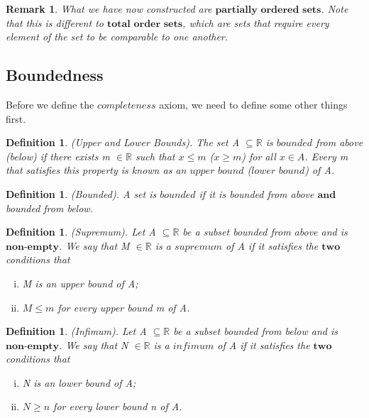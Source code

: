\documentclass[twoside]{article}
\newtheorem{remark}[theorem]{Remark}
\newtheorem{definition}[theorem]{Definition}
\begin{document}
\begin{remark}
What we have now constructed are $\textbf{partially ordered sets}$. Note that this is different to $\textbf{total order sets}$, which are sets that require every element of the set to be comparable to one another.
\end{remark}

\subsection{Boundedness}

Before we define the $\textit{completeness}$ axiom, we need to define some other things first.

\begin{definition}
(Upper and Lower Bounds). The set A $\subseteq \mathbb{R}$ is $\textit{bounded}$ from above (below) if there exists m $\in \mathbb{R}$ such that $x \leq m$ ($x \geq m$) for all $x \in A$. Every m that satisfies this property is known as an $\textit{upper bound}$ ($\textit{lower bound}$) of A. 
\end{definition}

\begin{definition}
(Bounded). A set is $\textit{bounded}$ if it is bounded from above $\textbf{and}$ bounded from below.
\end{definition}

\begin{definition}
(Supremum). Let A $\subseteq \mathbb{R}$ be a subset bounded from above and is $\textbf{non-empty}$. We say that M $\in \mathbb{R}$ is a $\textit{supremum}$ of A if it satisfies the $\textbf{two}$ conditions that
\begin{enumerate}[(i)]
  \item M is an upper bound of A;
  \item $M \leq m$ for every upper bound m of A. 
\end{enumerate}
\end{definition}

\begin{definition}
(Infimum). Let A $\subseteq \mathbb{R}$ be a subset bounded from below and is $\textbf{non-empty}$. We say that N $\in \mathbb{R}$ is a $\textit{infimum}$ of A if it satisfies the $\textbf{two}$ conditions that
\begin{enumerate}[(i)]
  \item N is an lower bound of A;
  \item $N \geq n$ for every lower bound n of A. 
\end{enumerate}
\end{definition}
\end{document}
